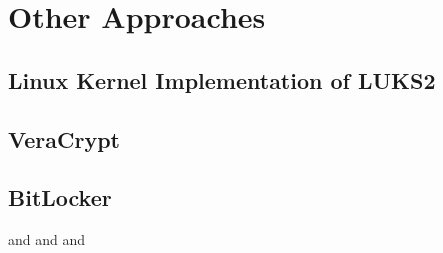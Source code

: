 \section{Other Approaches}
\label{chap:otherapproaches}

\subsection{Linux Kernel Implementation of LUKS2}
\label{chap:otherapproaches.linux}

\subsection{VeraCrypt}
\label{chap:otherapproaches.veracrypt}

\subsection{BitLocker}
\label{chap:otherapproaches.bitlocker}
\cite{Kornblum2009} and \cite{Lewis2018} and \cite{Tuerpe2009} and \cite{Tan2020}